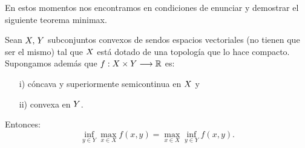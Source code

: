 En estos momentos nos encontramos en condiciones de enunciar y demostrar el siguiente teorema minimax.
\begin{teoremaBox}\label{MinMax}
Sean $ X,\hspace{0.5mm} Y $ subconjuntos convexos de sendos espacios vectoriales (no tienen que ser el mismo) tal que $ X $ está dotado de una topología que lo hace compacto. Supongamos además que $ f:  X \times Y \longrightarrow \mathbb{R} $ es:
\begin{itemize}	
\item[i)] cóncava y superiormente semicontinua en $ X $ y
\item[ii)] convexa en $ Y $.
\end{itemize}
Entonces:
\begin{equation*}\label{eqMinMax}
\inf_{y \in Y} \max_{x \in X} f(x,y) = \max_{x \in X} \inf_{y \in Y} f(x,y).
\end{equation*}
\end{teoremaBox}
